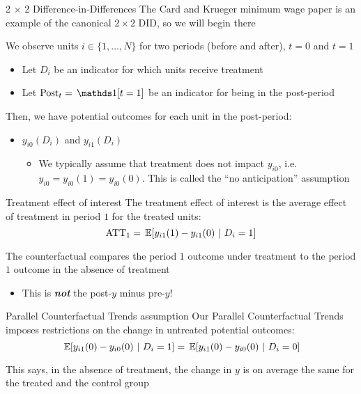 \documentclass[aspectratio=169,t,11pt,table]{beamer}
\begin{document}
\begin{frame}{2 $\times$ 2 Difference-in-Differences}
  The Card and Krueger minimum wage paper is an example of the canonical $2 \times 2$ DID, so we will begin there
  
  \bigskip
  We observe units $i \in \{ 1, \dots, N \}$ for two periods (before and after), $t = 0$ and $t = 1$
  \begin{itemize}
    \item Let $D_i$ be an indicator for which units receive treatment
    \item Let $\text{Post}_t = \one{t = 1}$ be an indicator for being in the post-period
  \end{itemize}


  \pause
  \bigskip
  Then, we have potential outcomes for each unit in the post-period:
  \begin{itemize}
    \item $y_{i0}(D_i)$ and $y_{i1}(D_i)$
    \begin{itemize}
      \item We typically assume that treatment does not impact $y_{i0}$, i.e. $y_{i0} = y_{i0}(1) = y_{i0}(0)$. This is called the ``no anticipation'' assumption
    \end{itemize}
  \end{itemize}  
\end{frame}

\begin{frame}{Treatment effect of interest}
  The treatment effect of interest is the average effect of treatment in period $1$ for the treated units:
  $$
    \text{ATT}_1 = \expec{y_{i1}(1) - y_{i1}(0)}{D_i = 1}
  $$
  
  The counterfactual compares the period $1$ outcome under treatment to the period $1$ outcome in the absence of treatment
  \begin{itemize}
    \item {\color{red} This is \emph{\textbf{not}} the post-$y$ minus pre-$y$!}
  \end{itemize}
\end{frame}

\begin{frame}{Parallel Counterfactual Trends assumption}
  Our \alert{Parallel Counterfactual Trends} imposes restrictions on the change in untreated potential outcomes:
  $$
    \expec{y_{i1}(0) - y_{i0}(0)}{D_i = 1} = \expec{y_{i1}(0) - y_{i0}(0)}{D_i = 0} 
  $$

  \bigskip
  This says, in the absence of treatment, the change in $y$ is on average the same for the treated and the control group
\end{frame}
\end{document}

